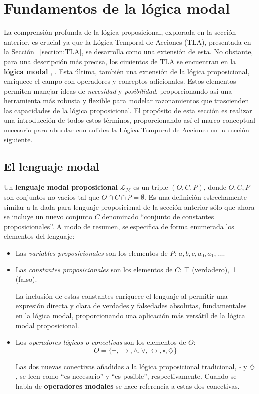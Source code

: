 \section{Fundamentos de la lógica modal}\label{section:lmodal}
La comprensión profunda de la lógica proposicional, explorada en la sección anterior, es crucial ya que la Lógica Temporal de Acciones (TLA), presentada en la Sección ~\ref{section:TLA}, se desarrolla como una extensión de esta. No obstante, para una descripción más precisa, los cimientos de TLA se encuentran en la \textbf{lógica modal} \cite{jansana2003logicamodal}, \cite{Zach2019-ZACBAD}. Esta última, también una extensión de la lógica proposicional, enriquece el campo con operadores y conceptos adicionales. Estos elementos permiten manejar ideas de \textit{necesidad} y \textit{posibilidad}, proporcionando así una herramienta más robusta y flexible para modelar razonamientos que trascienden las capacidades de la lógica proposicional. El propósito de esta sección es realizar una introducción de todos estos términos, proporcionando así el marco conceptual necesario para abordar con solidez la Lógica Temporal de Acciones en la sección siguiente.

\subsection{El lenguaje modal}\label{subsection:lmodallanguage}
Un \textbf{lenguaje modal proposicional} $\mathcal{L}_{\mathcal{M}}$ es un triple $(O,C,P)$, donde $O,C,P$ son conjuntos no vacíos tal que $O \cap C \cap P = \emptyset$. Es una definición estrechamente similar a la dada para lenguaje proposicional de la sección anterior sólo que ahora se incluye un nuevo conjunto $C$ denominado ``conjunto de constantes proposicionales''. A modo de resumen, se especifica de forma enumerada los elementos del lenguaje:

\begin{itemize}
    \item Las \textit{variables proposicionales} son los elementos de $P$: $a,b,c,a_0,a_1,\ldots$.
    \item Las \textit{constantes proposicionales} son los elementos de $C$: $\top$ (verdadero), $\bot$ (falso).

    La inclusión de estas constantes enriquece el lenguaje al permitir una expresión directa y clara de verdades y falsedades absolutas, fundamentales en la lógica modal, proporcionando una aplicación más versátil de la lógica modal proposicional.
    
    \item Los \textit{operadores lógicos o conectivas} son los elementos de $O$:
    $$
    O = \lbrace \neg, \rightarrow, \land, \lor, \leftrightarrow, \square, \diamondsuit \rbrace
    $$

    Las dos nuevas conectivas añadidas a la lógica proposicional tradicional, $\square$ y $\diamondsuit$, se leen como ``es necesario'' y ``es posible'', respectivamente. Cuando se habla de \textbf{operadores modales} se hace referencia a estas dos conectivas.
\end{itemize}


